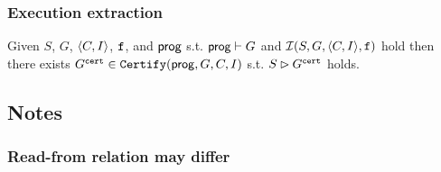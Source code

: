 \documentclass[12pt]{article}
\begin{document}




  
    

\subsubsection{Execution extraction}

\begin{lemma}
  \label{lemma:sim-extract}
  Given $S$, $G$, $\langle C, I \rangle$, ${\mathtt{f}}$, and $\mathsf{prog}$ 
  s.t. $\mathsf{prog} \vdash G$ and $\mathcal{I}(S, G, \langle C, I \rangle, {\mathtt{f}})$ hold
  then there exists $G^{{\mathtt{cert}}} \in {\mathtt{Certify}}(\mathsf{prog}, G, C, I)$ s.t.
  $S \rhd G^{{\mathtt{cert}}}$ holds.
\end{lemma}

\subsection{Notes}

\subsubsection{Read-from relation may differ}
\end{document}
